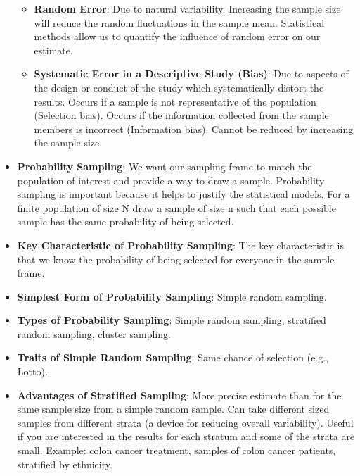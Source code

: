 \documentclass[12pt]{book}
\begin{document}
\begin{itemize}

    \begin{itemize}
    \item \textbf{Random Error}: Due to natural variability. Increasing the sample size will reduce the random fluctuations in the sample mean. Statistical methods allow us to quantify the influence of random error on our estimate.
    \item \textbf{Systematic Error in a Descriptive Study (Bias)}: Due to aspects of the design or conduct of the study which systematically distort the results. Occurs if a sample is not representative of the population (Selection bias). Occurs if the information collected from the sample members is incorrect (Information bias). Cannot be reduced by increasing the sample size.
    \end{itemize}
\item \textbf{Probability Sampling}: We want our sampling frame to match the population of interest and provide a way to draw a sample. Probability sampling is important because it helps to justify the statistical models. For a finite population of size N draw a sample of size n such that each possible sample has the same probability of being selected.
\item \textbf{Key Characteristic of Probability Sampling}: The key characteristic is that we know the probability of being selected for everyone in the sample frame.
\item \textbf{Simplest Form of Probability Sampling}: Simple random sampling.
\item \textbf{Types of Probability Sampling}: Simple random sampling, stratified random sampling, cluster sampling.
\item \textbf{Traits of Simple Random Sampling}: Same chance of selection (e.g., Lotto).
\item \textbf{Advantages of Stratified Sampling}: More precise estimate than for the same sample size from a simple random sample. Can take different sized samples from different strata (a device for reducing overall variability). Useful if you are interested in the results for each stratum and some of the strata are small. Example: colon cancer treatment, samples of colon cancer patients, stratified by ethnicity.

\end{itemize}
\end{document}
